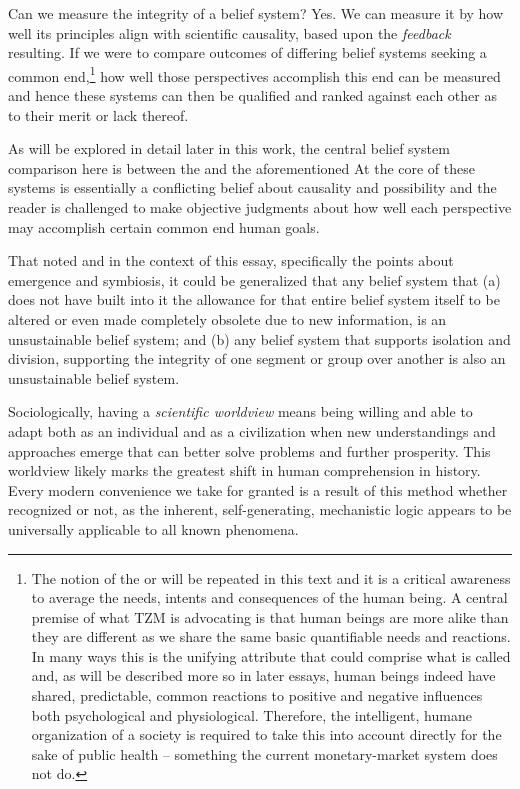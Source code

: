 \documentclass[10pt, a4paper, cleardoubleempty, openright, twoside]{book}
\begin{document}
Can we measure the integrity of a belief system? Yes. We can measure it
by how well its principles align with scientific causality, based upon
the \emph{feedback} resulting. If we were to compare outcomes of
differing belief systems seeking a common end,\footnote{
	The notion of the  or 
	will be repeated in this text and it is a critical awareness to
	average the needs, intents and consequences of the human being. A
	central premise of what TZM is advocating is that human beings are
	more alike than they are different as we share the same basic
	quantifiable needs and reactions.  In many ways this is the unifying
	attribute that could comprise what is called 
	and, as will be described more so in later essays, human beings indeed
	have shared, predictable, common reactions to positive and negative
	influences both psychological and physiological. Therefore, the
	intelligent, humane organization of a society is required to take this
	into account directly for the sake of public health -- something the
	current monetary-market system does not do.
} 
how well those perspectives accomplish this end can be measured and
hence these systems can then be qualified and ranked against each other
as to their merit or lack thereof. 

As will be explored in detail later in this work, the central belief
system comparison here is between the  and the
aforementioned  At the
core of these systems is essentially a conflicting belief about
causality and possibility and the reader is challenged to make objective
judgments about how well each perspective may accomplish certain common
end human goals.

That noted and in the context of this essay, specifically the points
about emergence and symbiosis, it could be generalized that any belief
system that (a) does not have built into it the allowance for that
entire belief system itself to be altered or even made completely
obsolete due to new information, is an unsustainable belief system; and
(b) any belief system that supports isolation and division, supporting
the integrity of one segment or group over another is also an
unsustainable belief system.

Sociologically, having a \emph{scientific worldview} means being willing
and able to adapt both as an individual and as a civilization when new
understandings and approaches emerge that can better solve problems and
further prosperity. This worldview likely marks the greatest shift in
human comprehension in history. Every modern convenience we take for
granted is a result of this method whether recognized or not, as the
inherent, self-generating, mechanistic logic appears to be universally
applicable to all known phenomena.
\end{document}
